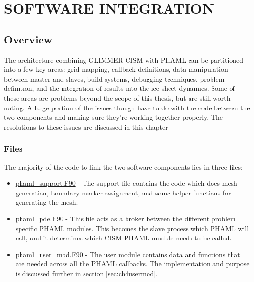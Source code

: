 \chapter{SOFTWARE INTEGRATION \label{ch:softintegration}}

\section{Overview}\label{sec:ch4over}

The architecture combining GLIMMER-CISM with PHAML can be partitioned into a few key areas:  grid mapping, callback definitions, data manipulation between master and slaves, build systems, debugging techniques, problem definition, and the integration of results into the ice sheet dynamics.  Some of these areas are problems beyond the scope of this thesis, but are still worth noting.  A large portion of the issues though have to do with the code between the two components and making sure they're working together properly.  The resolutions to these issues are discussed in this chapter.

\subsection{Files}

The majority of the code to link the two software components lies in three files: 

\begin{itemize}
\item \href{http://svn.berlios.de/svnroot/repos/glimmer-cism/glimmer-cism2/libphaml/phaml\_support.F90}{phaml\_support.F90} - The support file contains the code which does mesh generation, boundary marker assignment, and some helper functions for generating the mesh.
\item \href{http://svn.berlios.de/svnroot/repos/glimmer-cism/glimmer-cism2/libphaml/phaml\_pde.F90}{phaml\_pde.F90} - This file acts as a broker between the different problem specific PHAML modules.  This becomes the slave process which PHAML will call, and it determines which CISM PHAML module needs to be called.
\item \href{http://svn.berlios.de/svnroot/repos/glimmer-cism/glimmer-cism2/libphaml/phaml\_user\_mod.F90}{phaml\_user\_mod.F90} - The user module contains data and functions that are needed across all the PHAML callbacks.  The implementation and purpose is discussed further in section \ref{sec:ch4usermod}.
\end{itemize}

